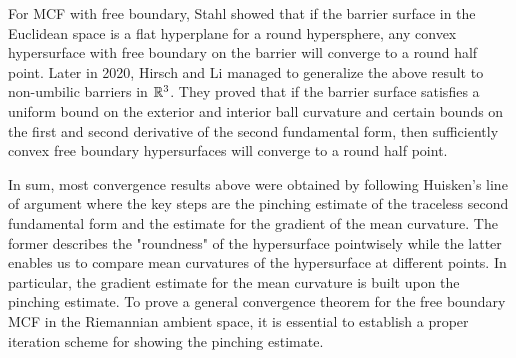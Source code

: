 For MCF with free boundary, Stahl \cite{stahl_convergence_1996,stahl_regularity_1996} showed that if the barrier surface in the Euclidean space is a flat hyperplane for a round hypersphere, any convex hypersurface with free boundary on the barrier will converge to a round half point. Later in 2020, Hirsch and Li \cite{hirsch2020contracting} managed to generalize the above result to non-umbilic barriers in $\mathbb{R}^3$. They proved that if the barrier surface satisfies a uniform bound on the exterior and interior ball curvature and certain bounds on the first and second derivative of the second fundamental form, then sufficiently convex free boundary hypersurfaces will converge to a round half point.

In sum, most convergence results above were obtained by following Huisken's line of argument where the key steps are the pinching estimate of the traceless second fundamental form and the estimate for the gradient of the mean curvature. The former describes the "roundness" of the hypersurface pointwisely while the latter enables us to compare mean curvatures of the hypersurface at different points. In particular, the gradient estimate for the mean curvature is built upon the pinching estimate. To prove a general convergence theorem for the free boundary MCF in the Riemannian ambient space, it is essential to establish a proper iteration scheme for showing the pinching estimate.




\chapterend

